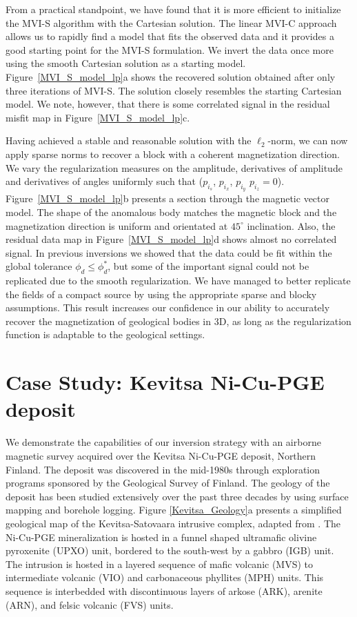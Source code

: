 \documentclass[paper]{geophysics}
\begin{document}
From a practical standpoint, we have found that it is more efficient to initialize the MVI-S algorithm with the Cartesian solution. The linear MVI-C approach allows us to rapidly find a model that fits the observed data and it provides a good starting point for the MVI-S formulation. We invert the data once more using the smooth Cartesian solution as a starting model. Figure~\ref{MVI_S_model_lp}a shows the recovered solution obtained after only three iterations of MVI-S. The solution closely resembles the starting Cartesian model. We note, however, that there is some correlated signal in the residual misfit map in Figure~\ref{MVI_S_model_lp}c.

Having achieved a stable and reasonable solution with the $\ell_2$-norm, we can now apply sparse norms to recover a block with a coherent magnetization direction.
We vary the regularization measures on the amplitude, derivatives of amplitude and derivatives of angles uniformly such that ($p_{i_s}$, $p_{i_x}$, $p_{i_y}$ $p_{i_z} = 0$).
Figure~\ref{MVI_S_model_lp}b presents a section through the magnetic vector model. The shape of the anomalous body matches the magnetic block and the magnetization direction is uniform and orientated at $45^\circ$ inclination. Also, the residual data map in Figure~\ref{MVI_S_model_lp}d shows almost no correlated signal. In previous inversions we showed that the data could be fit within the global tolerance $\phi_d \leq \phi_d^*$, but some of the important signal could not be replicated due to the smooth regularization. We have managed to better replicate the fields of a compact source by using the appropriate sparse and blocky assumptions. This result increases our confidence in our ability to accurately recover the magnetization of geological bodies in 3D, as long as the regularization function is adaptable to the geological settings.


\section{Case Study: Kevitsa Ni-Cu-PGE deposit}
We demonstrate the capabilities of our inversion strategy with an airborne magnetic survey acquired over the Kevitsa Ni-Cu-PGE deposit, Northern Finland.
The deposit was discovered in the mid-1980s through exploration programs sponsored by the Geological Survey of Finland.
The geology of the deposit has been studied extensively over the past three decades by using  surface mapping and borehole logging.
Figure \ref{Kevitsa_Geology}a presents a simplified geological map of the Kevitsa-Satovaara intrusive complex, adapted from \cite{Koivisto2015}.
The Ni-Cu-PGE mineralization is hosted in a funnel shaped ultramafic olivine pyroxenite (UPXO) unit, bordered to the south-west by a gabbro (IGB) unit. The intrusion is hosted in a layered sequence of mafic volcanic (MVS) to intermediate volcanic (VIO) and carbonaceous phyllites (MPH) units. This sequence is interbedded with discontinuous layers of arkose (ARK), arenite (ARN), and felsic volcanic (FVS) units.
\end{document}
